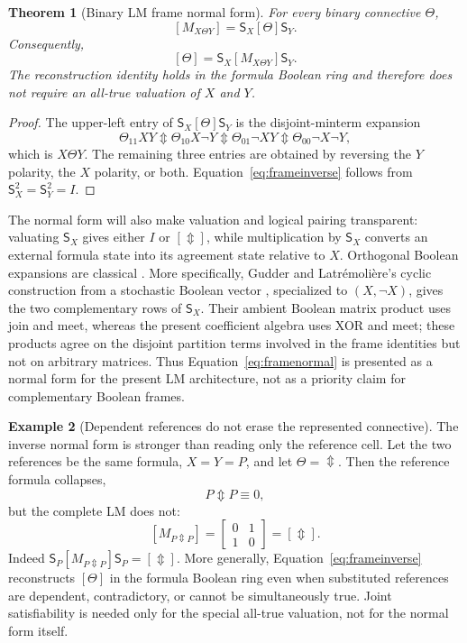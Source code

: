 \documentclass[11pt]{article}
\newtheorem{theorem}{Theorem}[section]
\theoremstyle{definition}
\newtheorem{example}[theorem]{Example}
\theoremstyle{remark}
\newcommand{\xor}{\mathbin{\Updownarrow}}
\begin{document}
\begin{theorem}[Binary LM frame normal form]
For every binary connective $\Theta$,
\begin{equation}
 \boxed{[M_{X\Theta Y}]=\mathsf S_X[\Theta]\mathsf S_Y.}
 \label{eq:framenormal}
\end{equation}
Consequently,
\begin{equation}
 \boxed{[\Theta]=\mathsf S_X[M_{X\Theta Y}]\mathsf S_Y.}
 \label{eq:frameinverse}
\end{equation}
The reconstruction identity holds in the formula Boolean ring and therefore does not require an all-true valuation of $X$ and $Y$.
\end{theorem}
\begin{proof}
The upper-left entry of $\mathsf S_X[\Theta]\mathsf S_Y$ is the disjoint-minterm expansion
\[
 \Theta_{11}XY\xor\Theta_{10}X\neg Y\xor
 \Theta_{01}\neg X Y\xor\Theta_{00}\neg X\neg Y,
\]
which is $X\Theta Y$.  The remaining three entries are obtained by reversing the $Y$ polarity, the $X$ polarity, or both.  Equation~\eqref{eq:frameinverse} follows from $\mathsf S_X^2=\mathsf S_Y^2=I$.
\end{proof}

The normal form will also make valuation and logical pairing transparent: valuating $\mathsf S_X$ gives either $I$ or $[\Updownarrow]$, while multiplication by $\mathsf S_X$ converts an external formula state into its agreement state relative to $X$.  Orthogonal Boolean expansions are classical \cite{Sampei1950}.  More specifically, Gudder and Latr\'emoli\`ere's cyclic construction from a stochastic Boolean vector \cite[Example~2.13]{Gudder2009}, specialized to $(X,\neg X)$, gives the two complementary rows of $\mathsf S_X$.  Their ambient Boolean matrix product uses join and meet, whereas the present coefficient algebra uses XOR and meet; these products agree on the disjoint partition terms involved in the frame identities but not on arbitrary matrices.  Thus Equation~\eqref{eq:framenormal} is presented as a normal form for the present LM architecture, not as a priority claim for complementary Boolean frames.

\begin{example}[Dependent references do not erase the represented connective]
The inverse normal form is stronger than reading only the reference cell.  Let the two references be the same formula, $X=Y=P$, and let $\Theta=\Updownarrow$.  Then the reference formula collapses,
\[
 P\xor P\equiv0,
\]
but the complete LM does not:
\[
 [M_{P\Updownarrow P}]
 =\begin{bmatrix}0&1\\1&0\end{bmatrix}
 =[\Updownarrow].
\]
Indeed $\mathsf S_P[M_{P\Updownarrow P}]\mathsf S_P=[\Updownarrow]$.  More generally, Equation~\eqref{eq:frameinverse} reconstructs $[\Theta]$ in the formula Boolean ring even when substituted references are dependent, contradictory, or cannot be simultaneously true.  Joint satisfiability is needed only for the special all-true valuation, not for the normal form itself.
\end{example}
\end{document}
